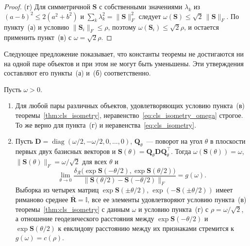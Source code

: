 \begin{proof}
(г) Для симметричной $\mathbf{S}$ с собственными значениями $\lambda_k$ из $(a-b)^2 \leqslant 2(a^2 + b^2)$ и $\sum_k \lambda_k^2 = \|\mathbf{S}\|_F^2$ следует $\omega(\mathbf{S}) \leqslant \sqrt{2}\,\|\mathbf{S}\|_F$. По пункту~(а) и условию $\|\mathbf{S}_i\|_F \leqslant \rho$, поэтому $\omega(\mathbf{S}_i) \leqslant \sqrt{2}\rho$, и остается применить пункт~(в) с $\omega = \sqrt{2}\rho$.
\end{proof}

Следующее предложение показывает, что константы теоремы не достигаются ни на одной паре объектов и при этом не могут быть уменьшены. Эти утверждения составляют его пункты~(а) и~(б) соответственно.

\begin{proposition}\label{prop:cls_sharp}
Пусть $\omega > 0$.
\begin{enumerate}
    \item[(а)] Для любой пары различных объектов, удовлетворяющих условию пункта~(в) теоремы~\ref{thm:cls_isometry}, неравенство~\eqref{eq:cls_isometry_omega} строгое. То же верно для пункта~(г) и неравенства~\eqref{eq:cls_isometry}.
    \item[(б)] Пусть $\mathbf{D} = \operatorname{diag}(\omega/2, -\omega/2, 0, \ldots, 0)$, $\mathbf{Q}_{\theta}$~--- поворот на угол $\theta$ в плоскости первых двух базисных векторов и $\mathbf{S}(\theta) = \mathbf{Q}_{\theta} \mathbf{D} \mathbf{Q}_{\theta}^{\top}$. Тогда $\omega(\mathbf{S}(\theta)) = \omega$, $\|\mathbf{S}(\theta)\|_F = \omega/\sqrt{2}$ для всех $\theta$ и
    \begin{equation}\label{eq:cls_sharp}
    \lim_{\theta \to 0} \frac{\delta_{\mathcal{R}}\big(\exp \mathbf{S}(-\theta/2), \exp \mathbf{S}(\theta/2)\big)}{\|\mathbf{S}(\theta/2) - \mathbf{S}(-\theta/2)\|_F} = g(\omega).
    \end{equation}
    Выборка из четырех матриц $\exp\mathbf{S}(\pm\theta/2)$, $\exp(-\mathbf{S}(\pm\theta/2))$ имеет риманово среднее $\bar{\mathbf{R}} = \mathbb{I}$, все ее элементы удовлетворяют условию пункта~(в) теоремы~\ref{thm:cls_isometry} с данным $\omega$ и условию пункта~(г) с $\rho = \omega/\sqrt{2}$, а отношение геодезического расстояния между $\exp\mathbf{S}(-\theta/2)$ и $\exp\mathbf{S}(\theta/2)$ к евклидову расстоянию между их признаками стремится к $g(\omega) = c(\rho)$.
\end{enumerate}
\end{proposition}
